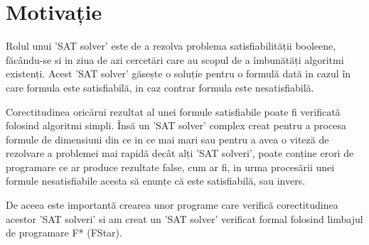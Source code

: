 \chapter*{Motivație} 

Rolul unui 'SAT solver' este de a rezolva problema satisfiabilității booleene, \linebreak făcându-se si in ziua de azi cercetări care au scopul de a îmbunătăți algoritmi existenți. Acest 'SAT solver' găsește o soluție pentru o formulă dată in cazul în care formula este satisfiabilă, in caz contrar formula este nesatisfiabilă. 

Corectitudinea oricărui rezultat al unei formule satisfiabile poate fi verificată
\linebreak folosind algoritmi simpli. Însă un 'SAT solver' complex creat pentru a procesa \linebreak formule de dimensiuni din ce in ce mai mari sau pentru a avea o viteză de rezolvare a \linebreak problemei mai rapidă decât alți 'SAT solveri', poate conține erori de programare ce ar produce rezultate false, cum ar fi, in urma procesării unei formule nesatisfiabile acesta să enunțe că este satisfiabilă, sau invers.

De aceea este importantă crearea unor programe care verifică corectitudinea \linebreak acestor 'SAT solveri' si am creat un 'SAT solver' verificat formal folosind limbajul de programare F* (FStar).